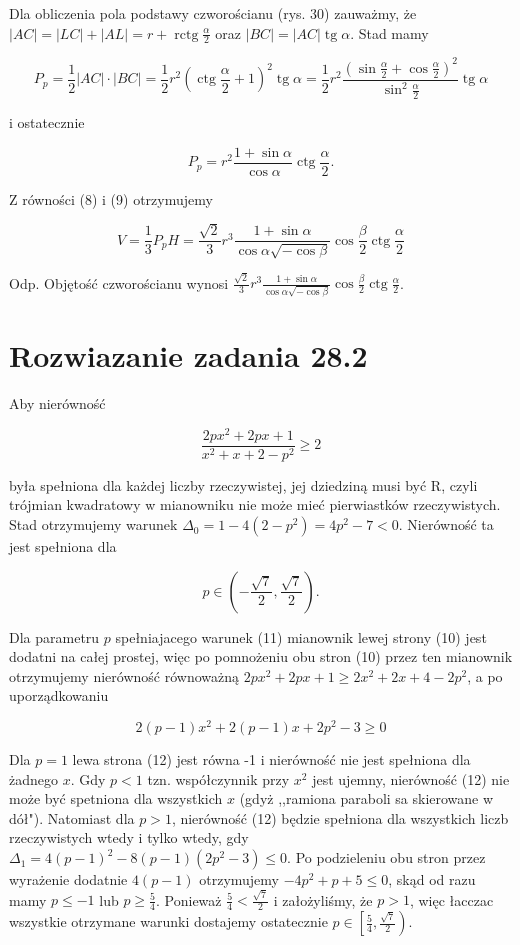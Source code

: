 \documentclass[10pt]{article}
\begin{document}
Dla obliczenia pola podstawy czworościanu (rys. 30) zauważmy, że $|A C|=|L C|+|A L|=r+\operatorname{rctg} \frac{\alpha}{2}$ oraz $|B C|=|A C| \operatorname{tg} \alpha$. Stad mamy

$$
P_{p}=\frac{1}{2}|A C| \cdot|B C|=\frac{1}{2} r^{2}\left(\operatorname{ctg} \frac{\alpha}{2}+1\right)^{2} \operatorname{tg} \alpha=\frac{1}{2} r^{2} \frac{\left(\sin \frac{\alpha}{2}+\cos \frac{\alpha}{2}\right)^{2}}{\sin ^{2} \frac{\alpha}{2}} \operatorname{tg} \alpha
$$

i ostatecznie

$$
P_{p}=r^{2} \frac{1+\sin \alpha}{\cos \alpha} \operatorname{ctg} \frac{\alpha}{2} .
$$

Z równości (8) i (9) otrzymujemy

$$
V=\frac{1}{3} P_{p} H=\frac{\sqrt{2}}{3} r^{3} \frac{1+\sin \alpha}{\cos \alpha \sqrt{-\cos \beta}} \cos \frac{\beta}{2} \operatorname{ctg} \frac{\alpha}{2}
$$

Odp. Objętość czworościanu wynosi $\frac{\sqrt{2}}{3} r^{3} \frac{1+\sin \alpha}{\cos \alpha \sqrt{-\cos \beta}} \cos \frac{\beta}{2} \operatorname{ctg} \frac{\alpha}{2}$.

\section*{Rozwiazanie zadania 28.2}
Aby nierówność

$$
\frac{2 p x^{2}+2 p x+1}{x^{2}+x+2-p^{2}} \geq 2
$$

była spełniona dla każdej liczby rzeczywistej, jej dziedziną musi być R, czyli trójmian kwadratowy w mianowniku nie może mieć pierwiastków rzeczywistych. Stad otrzymujemy warunek $\Delta_{0}=1-4\left(2-p^{2}\right)=4 p^{2}-7<0$. Nierówność ta jest spełniona dla

$$
p \in\left(-\frac{\sqrt{7}}{2}, \frac{\sqrt{7}}{2}\right) .
$$

Dla parametru $p$ spełniajacego warunek (11) mianownik lewej strony (10) jest dodatni na całej prostej, więc po pomnożeniu obu stron (10) przez ten mianownik otrzymujemy nierówność równoważną $2 p x^{2}+2 p x+1 \geq 2 x^{2}+2 x+4-2 p^{2}$, a po uporządkowaniu

$$
2(p-1) x^{2}+2(p-1) x+2 p^{2}-3 \geq 0
$$

Dla $p=1$ lewa strona (12) jest równa -1 i nierówność nie jest spełniona dla żadnego $x$. Gdy $p<1$ tzn. współczynnik przy $x^{2}$ jest ujemny, nierówność (12) nie może być spetniona dla wszystkich $x$ (gdyż ,,ramiona paraboli sa skierowane w dół"). Natomiast dla $p>1$, nierówność (12) będzie spełniona dla wszystkich liczb rzeczywistych wtedy i tylko wtedy, gdy $\Delta_{1}=4(p-1)^{2}-8(p-1)\left(2 p^{2}-3\right) \leq 0$. Po podzieleniu obu stron przez wyrażenie dodatnie $4(p-1)$ otrzymujemy $-4 p^{2}+p+5 \leq 0$, skąd od razu mamy $p \leq-1$ lub $p \geq \frac{5}{4}$. Ponieważ $\frac{5}{4}<\frac{\sqrt{7}}{2}$ i założyliśmy, że $p>1$, więc łacczac wszystkie otrzymane warunki dostajemy ostatecznie $p \in\left[\frac{5}{4}, \frac{\sqrt{7}}{2}\right)$.
\end{document}
